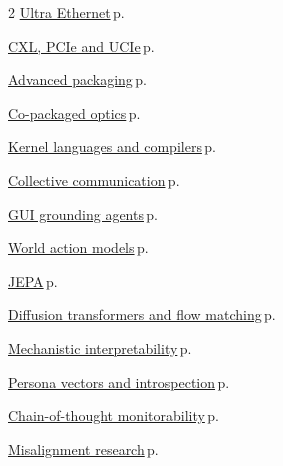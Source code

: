 \documentclass[10pt,a4paper,openany]{report}
\begin{document}
\begin{multicols}{2}
\hyperref[c:hardware-5]{Ultra Ethernet}\,{\color{muted}\scriptsize p.\,\pageref{c:hardware-5}}\par\vspace{1pt}
\hyperref[c:hardware-7]{CXL, PCIe and UCIe}\,{\color{muted}\scriptsize p.\,\pageref{c:hardware-7}}\par\vspace{1pt}
\hyperref[c:hardware-9]{Advanced packaging}\,{\color{muted}\scriptsize p.\,\pageref{c:hardware-9}}\par\vspace{1pt}
\hyperref[c:hardware-10]{Co-packaged optics}\,{\color{muted}\scriptsize p.\,\pageref{c:hardware-10}}\par\vspace{1pt}
\hyperref[c:hardware-13]{Kernel languages and compilers}\,{\color{muted}\scriptsize p.\,\pageref{c:hardware-13}}\par\vspace{1pt}
\hyperref[c:hardware-14]{Collective communication}\,{\color{muted}\scriptsize p.\,\pageref{c:hardware-14}}\par\vspace{1pt}
\hyperref[c:vlm-6]{GUI grounding agents}\,{\color{muted}\scriptsize p.\,\pageref{c:vlm-6}}\par\vspace{1pt}
\hyperref[c:embodied-1]{World action models}\,{\color{muted}\scriptsize p.\,\pageref{c:embodied-1}}\par\vspace{1pt}
\hyperref[c:embodied-3]{JEPA}\,{\color{muted}\scriptsize p.\,\pageref{c:embodied-3}}\par\vspace{1pt}
\hyperref[c:embodied-5]{Diffusion transformers and flow matching}\,{\color{muted}\scriptsize p.\,\pageref{c:embodied-5}}\par\vspace{1pt}
\hyperref[c:safety-6]{Mechanistic interpretability}\,{\color{muted}\scriptsize p.\,\pageref{c:safety-6}}\par\vspace{1pt}
\hyperref[c:safety-7]{Persona vectors and introspection}\,{\color{muted}\scriptsize p.\,\pageref{c:safety-7}}\par\vspace{1pt}
\hyperref[c:safety-8]{Chain-of-thought monitorability}\,{\color{muted}\scriptsize p.\,\pageref{c:safety-8}}\par\vspace{1pt}
\hyperref[c:safety-9]{Misalignment research}\,{\color{muted}\scriptsize p.\,\pageref{c:safety-9}}\par\vspace{1pt}
\end{multicols}
\end{document}
